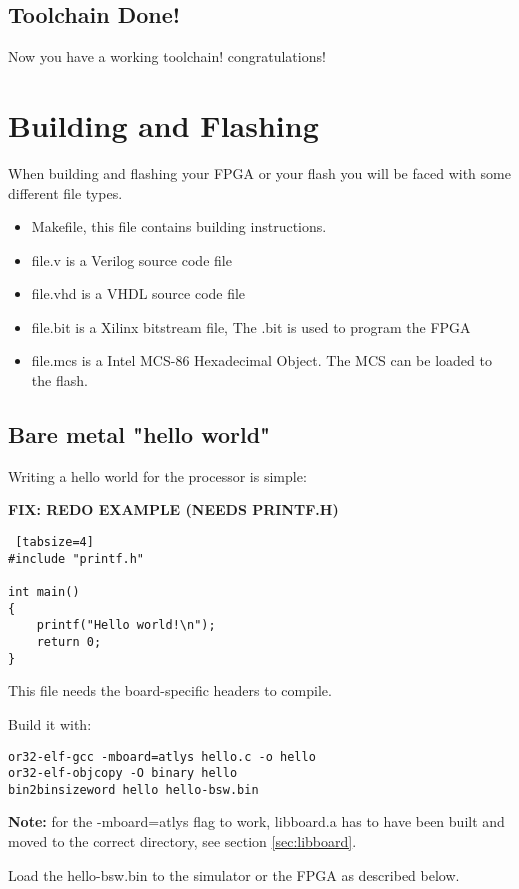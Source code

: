 \documentclass[10pt,a4paper]{article}
\begin{document}
\subsection{Toolchain Done!}
Now you have a working toolchain! congratulations!

\section{Building and Flashing}
When building and flashing your FPGA or your flash you will be faced with some different file types.
\begin{itemize}
\item   Makefile, this file contains building instructions.
\item	file.v is a Verilog source code file 
\item	file.vhd is a VHDL source code file
\item	file.bit is a Xilinx bitstream file, The .bit is used to program the FPGA
\item	file.mcs is a Intel MCS-86 Hexadecimal Object. The MCS can be loaded to the flash.
\end{itemize}

\subsection{Bare metal "hello world"}

Writing a hello world for the processor is simple:

\textbf{FIX: REDO EXAMPLE (NEEDS PRINTF.H)}

\begin{lstlisting} [tabsize=4]
#include "printf.h"

int main()
{
	printf("Hello world!\n");
	return 0;
}
\end{lstlisting}

This file needs the board-specific headers to compile.

Build it with:

\begin{lstlisting}
or32-elf-gcc -mboard=atlys hello.c -o hello
or32-elf-objcopy -O binary hello
bin2binsizeword hello hello-bsw.bin
\end{lstlisting}

\textbf{Note:} for the -mboard=atlys flag to work, libboard.a has to have been built and moved to the correct directory, see section \ref{sec:libboard}.

Load the hello-bsw.bin to the simulator or the FPGA as described below.
\end{document}
